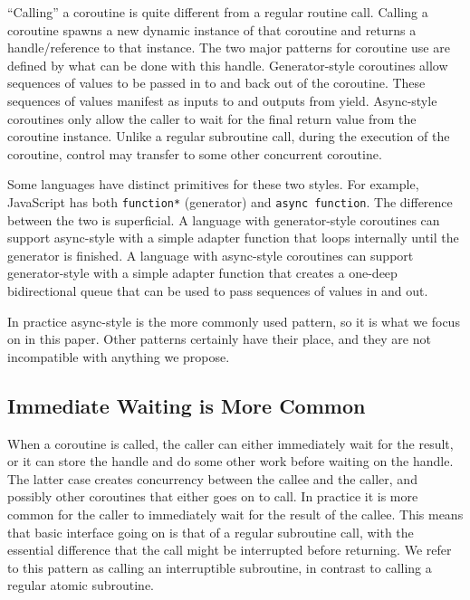 \documentclass[a4paper,UKenglish,cleveref, autoref]{lipics-v2019}
\begin{document}
``Calling'' a coroutine is quite different from a regular routine call.
Calling a coroutine spawns a new dynamic instance of that coroutine and returns a handle{\slash}reference to that instance\footnotemark{}.
The two major patterns for coroutine use are defined by what can be done with this handle.
Generator-style coroutines allow sequences of values to be passed in to and back out of the coroutine.
These sequences of values manifest as inputs to and outputs from yield.
Async-style coroutines only allow the caller to wait for the final return value from the coroutine instance.
Unlike a regular subroutine call, during the execution of the coroutine, control may transfer to some other concurrent coroutine.


Some languages have distinct primitives for these two styles.
For example, JavaScript has both \texttt{function*} (generator) and \texttt{async function}.
The difference between the two is superficial.
A language with generator-style coroutines can support async-style with a simple adapter function that loops internally until the generator is finished.
A language with async-style coroutines can support generator-style with a simple adapter function that creates a one-deep bidirectional queue that can be used to pass sequences of values in and out.

In practice async-style is the more commonly used pattern, so it is what we focus on in this paper.
Other patterns certainly have their place, and they are not incompatible with anything we propose.

\subsection{Immediate Waiting is More Common}

When a coroutine is called, the caller can either immediately wait for the result, or it can store the handle and do some other work before waiting on the handle.
The latter case creates concurrency between the callee and the caller, and possibly other coroutines that either goes on to call.
In practice it is more common for the caller to immediately wait for the result of the callee.
This means that basic interface going on is that of a regular subroutine call, with the essential difference that the call might be interrupted before returning.
We refer to this pattern as calling an interruptible subroutine, in contrast to calling a regular atomic subroutine.
\end{document}
